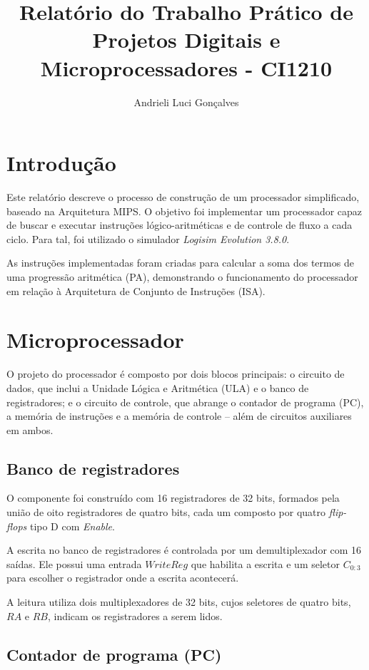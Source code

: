 \documentclass[twocolumn, 11pt]{article}
\author{Andrieli Luci Gonçalves}
\title{Relatório do Trabalho Prático de Projetos Digitais e Microprocessadores - CI1210}
\begin{document}
\maketitle        

\section{Introdução}

Este relatório descreve o processo de construção de um processador simplificado, baseado na Arquitetura MIPS. O objetivo foi implementar um processador capaz de buscar e executar instruções lógico-aritméticas e de controle de fluxo a cada ciclo. Para tal, foi utilizado o simulador \textit{Logisim Evolution 3.8.0}.

As instruções implementadas foram criadas para calcular a soma dos termos de uma progressão aritmética (PA), demonstrando o funcionamento do processador em relação à Arquitetura de Conjunto de Instruções (ISA).

\section{Microprocessador}

O projeto do processador é composto por dois blocos principais: o circuito de dados, que inclui a Unidade Lógica e Aritmética (ULA) e o banco de registradores; e o circuito de controle, que abrange o contador de programa (PC), a memória de instruções e a memória de controle -- além de circuitos auxiliares em ambos.

\subsection{Banco de registradores}

O componente foi construído com 16 registradores de 32 bits, formados pela união de oito registradores de quatro bits, cada um composto por quatro \textit{flip-flops} tipo D com \textit{Enable}.

A escrita no banco de registradores é controlada por um demultiplexador com 16 saídas. Ele possui uma entrada $WriteReg$ que habilita a escrita e um seletor $C_{0:3}$ para escolher o registrador onde a escrita acontecerá.

A leitura utiliza dois multiplexadores de 32 bits, cujos seletores de quatro bits, $RA$ e $RB$, indicam os registradores a serem lidos.

\subsection{Contador de programa (PC)}
\end{document}
